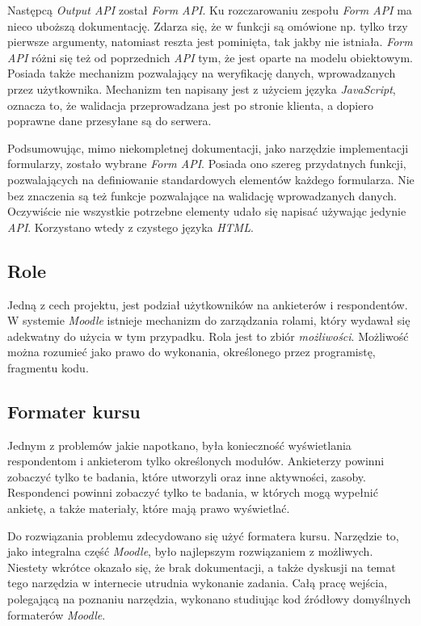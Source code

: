 \documentclass[12pt]{article}
\begin{document}
Następcą \emph{Output API} został \emph{Form API}. Ku rozczarowaniu zespołu \emph{Form API} ma nieco uboższą dokumentację. Zdarza się, że w funkcji są omówione np. tylko trzy pierwsze argumenty, natomiast reszta jest pominięta, tak jakby nie istniała. \emph{Form API} różni się też od poprzednich \emph{API} tym, że jest oparte na modelu obiektowym. Posiada także mechanizm pozwalający na weryfikację danych, wprowadzanych przez użytkownika. Mechanizm ten napisany jest z użyciem języka \emph{JavaScript}, oznacza to, że walidacja przeprowadzana jest po stronie klienta, a dopiero poprawne dane przesyłane są do serwera.

Podsumowując, mimo niekompletnej dokumentacji, jako narzędzie implementacji formularzy, zostało wybrane \emph{Form API}. Posiada ono szereg przydatnych funkcji, pozwalających na definiowanie standardowych elementów każdego formularza. Nie bez znaczenia są też funkcje pozwalające na walidację wprowadzanych danych. Oczywiście nie wszystkie potrzebne elementy udało się napisać używając jedynie \emph{API}. Korzystano wtedy z czystego języka \emph{HTML}. 

\subsection{Role}
Jedną z cech projektu, jest podział użytkowników na ankieterów i respondentów. W systemie \emph{Moodle} istnieje mechanizm do zarządzania rolami, który wydawał się adekwatny do użycia w tym przypadku. Rola jest to zbiór \emph{możliwości}. Możliwość można rozumieć jako prawo do wykonania, określonego przez programistę, fragmentu kodu.

\subsection{Formater kursu}
Jednym z problemów jakie napotkano, była konieczność wyświetlania respondentom i ankieterom tylko określonych modułów. Ankieterzy powinni zobaczyć tylko te badania, które utworzyli oraz inne aktywności, zasoby. Respondenci powinni zobaczyć tylko te badania, w których mogą wypełnić ankietę, a także materiały, które mają prawo wyświetlać.

Do rozwiązania problemu zdecydowano się użyć formatera kursu. Narzędzie to, jako integralna część \emph{Moodle}, było najlepszym rozwiązaniem z możliwych. Niestety wkrótce okazało się, że brak dokumentacji, a także dyskusji na temat tego narzędzia w internecie utrudnia wykonanie zadania. Całą pracę wejścia, polegającą na poznaniu narzędzia, wykonano studiując kod źródłowy domyślnych formaterów \emph{Moodle}.
\end{document}
